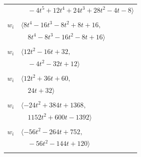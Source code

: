 \documentclass[11pt]{article}
\begin{document}
\begin{longtable}{@{}ll@{}}
 & $\quad -4t^{5}+12t^{4}+24t^{3}+28t^{2}-4t-8\rangle$\\
\addlinespace[2pt]
\multicolumn{2}{@{}p{0.97\textwidth}@{}}{$i=10$, $D_i=8$, $\rho_{ij}$: $13{:}2, \allowbreak 29{:}1, \allowbreak 33{:}1, \allowbreak 37{:}1, \allowbreak 55{:}2, \allowbreak 56{:}1, \allowbreak 59{:}2$}\\
$w_i$ & $\langle 8t^{4}-16t^{3}-8t^{2}+8t+16,$\\
 & $\quad 8t^{4}-8t^{3}-16t^{2}-8t+16\rangle$\\
\addlinespace[2pt]
\multicolumn{2}{@{}p{0.97\textwidth}@{}}{$i=11$, $D_i=4$, $\rho_{ij}$: $2{:}1, \allowbreak 3{:}1, \allowbreak 9{:}1, \allowbreak 23{:}1, \allowbreak 28{:}2, \allowbreak 29{:}2, \allowbreak 43{:}2, \allowbreak 49{:}1, \allowbreak 50{:}2, \allowbreak 59{:}2$}\\
$w_i$ & $\langle 12t^{2}-16t+32,$\\
 & $\quad -4t^{2}-32t+12\rangle$\\
\addlinespace[2pt]
\multicolumn{2}{@{}p{0.97\textwidth}@{}}{$i=12$, $D_i=4$, $\rho_{ij}$: $0{:}2, \allowbreak 7{:}2, \allowbreak 19{:}1, \allowbreak 25{:}1, \allowbreak 29{:}1, \allowbreak 49{:}2$}\\
$w_i$ & $\langle 12t^{2}+36t+60,$\\
 & $\quad 24t+32\rangle$\\
\addlinespace[2pt]
\multicolumn{2}{@{}p{0.97\textwidth}@{}}{$i=13$, $D_i=104$, $\rho_{ij}$: $1{:}2, \allowbreak 3{:}2, \allowbreak 9{:}1, \allowbreak 10{:}1, \allowbreak 29{:}1, \allowbreak 31{:}1, \allowbreak 35{:}2, \allowbreak 43{:}2, \allowbreak 44{:}1, \allowbreak 46{:}2, \allowbreak 55{:}2, \allowbreak 61{:}1$}\\
$w_i$ & $\langle -24t^{2}+384t+1368,$\\
 & $\quad 1152t^{2}+600t-1392\rangle$\\
\addlinespace[2pt]
\multicolumn{2}{@{}p{0.97\textwidth}@{}}{$i=14$, $D_i=8$, $\rho_{ij}$: $6{:}1, \allowbreak 8{:}2, \allowbreak 16{:}1, \allowbreak 17{:}1, \allowbreak 20{:}1, \allowbreak 24{:}1, \allowbreak 27{:}1, \allowbreak 32{:}1, \allowbreak 36{:}2, \allowbreak 42{:}2, \allowbreak 43{:}2, \allowbreak 45{:}2, \allowbreak 47{:}2, \allowbreak 49{:}1, \allowbreak 53{:}1, \allowbreak 55{:}1$}\\
$w_i$ & $\langle -56t^{2}-264t+752,$\\
 & $\quad -56t^{2}-144t+120\rangle$\\
\addlinespace[2pt]
\multicolumn{2}{@{}p{0.97\textwidth}@{}}{$i=15$, $D_i=104$, $\rho_{ij}$: $0{:}1, \allowbreak 5{:}1, \allowbreak 17{:}2, \allowbreak 19{:}2, \allowbreak 24{:}2, \allowbreak 25{:}1, \allowbreak 29{:}2, \allowbreak 39{:}2, \allowbreak 42{:}2, \allowbreak 45{:}1, \allowbreak 53{:}2$}\\

\end{longtable}
\end{document}

